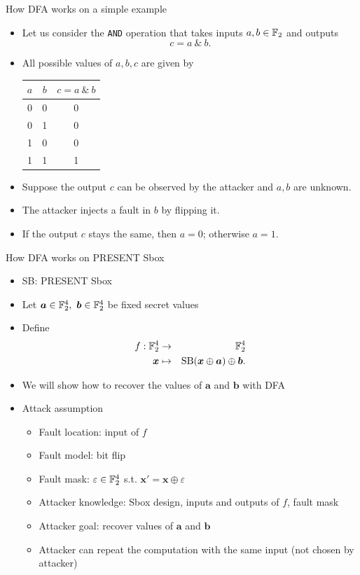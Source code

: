 \begin{frame}{How DFA works on a simple example}
\begin{itemize}
    \item  Let us consider the \texttt{AND} operation that takes inputs $a, b\in{\mathbb F}_2$ and outputs
    \[
    c=a\ \& \ b.
    \]
    \item  All possible values of $a,b,c$ are given by
    \begin{center}
        \begin{tabular}{|c|c|c|}\hline
$a$ & $b$ & $c = a \ \&\ b$ \\ \hline
0 & 0 & 0  \\
0 & 1 & 0  \\ \hline
1 & 0 & 0  \\
1 & 1 & 1  \\ \hline
\end{tabular}
    \end{center}
\item Suppose the output $c$ can be observed by the attacker and $a,b$ are unknown.
\item The attacker injects a fault in $b$ by flipping it.
\item If the output $c$ stays the same, then $a=0$; otherwise $a=1$.
\end{itemize}
\end{frame}

\begin{frame}{How DFA works on PRESENT Sbox}
    \begin{itemize}
       \item SB: PRESENT Sbox
        \item Let $\boldsymbol{a}\in\FF_2^4,\ \boldsymbol{b}\in\FF_2^4$ be fixed secret values
        \item Define
\begin{eqnarray*}
    f:{\mathbb F}_2^4&\to&{\mathbb F}_2^4\\
    \boldsymbol{x}&\mapsto& \text{SB}(\boldsymbol{x}\oplus\boldsymbol{a})\oplus\boldsymbol{b}.\nonumber
\end{eqnarray*}
\item We will show how to recover the values of $\boldsymbol{a}$ and $\boldsymbol{b}$ with DFA
\item Attack assumption
\begin{itemize}
     \item Fault location: input of $f$
    \item Fault model: bit flip
    \item Fault mask: $\varepsilon\in{\mathbb F}_2^4$ s.t. $\boldsymbol{x}'=\boldsymbol{x}\oplus\varepsilon$
        \item Attacker knowledge: Sbox design, inputs and outputs of $f$, fault mask
        \item Attacker goal: recover values of $\boldsymbol{a}$ and $\boldsymbol{b}$
        \item Attacker can repeat the computation with the same input (not chosen by attacker)
\end{itemize}
    \end{itemize}
\end{frame}

